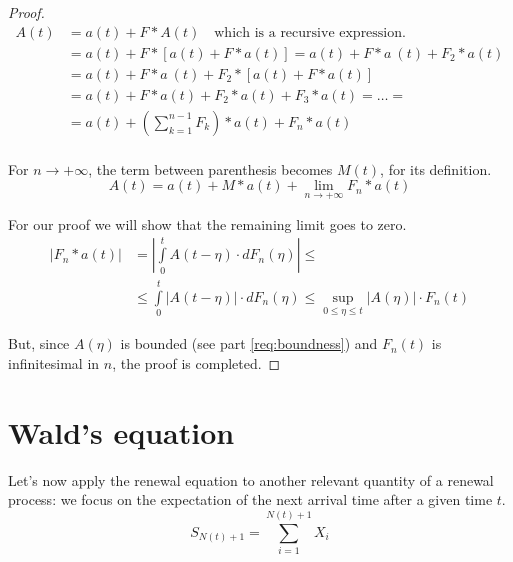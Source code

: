 \begin{proof}
	\begin{equation}\begin{split}
		A(t) &= a(t) + F \ast A(t) \quad \text{which is a recursive expression.} \\
		&= a(t) + F \ast \left[a(t) + F \ast a(t) \right] = a(t) + F \ast a ~ (t) + F_2 \ast a(t) \\
		&= a(t) + F \ast a ~ (t) + F_2 \ast \left[a(t) + F \ast a(t) \right] \\
		&= a(t) + F \ast a(t) + F_2 \ast a(t) + F_3 \ast a(t) = \dots  = \\
		&= a(t) + \left( \sum\limits_{k=1}^{n-1}F_k\right) \ast a(t) + F_n \ast a(t) \\
	\end{split} \end{equation}

	For $n \to +\infty$, the term between parenthesis becomes $M(t)$, for its definition.
	\begin{equation}
		A(t) = a(t) + M \ast a(t) + \lim_{n \to +\infty} F_n \ast a(t)
	\end{equation}

	For our proof we will show that the remaining limit goes to zero.
	\begin{equation} \begin{split}
		|F_n \ast a(t)| & = \left| \int\limits_0^{t}A(t-\eta) \cdot dF_n(\eta) \right| \le \\
		& \le \int\limits_0^{t}|A(t-\eta)| \cdot dF_n(\eta) \le \sup\limits_{0 \le \eta \le t} |A(\eta)| \cdot F_n (t)
	\end{split}\end{equation}

	But, since $A(\eta)$ is bounded (see part \ref{req:boundness}) and $F_n(t)$ is infinitesimal in $n$, the proof is completed.
\end{proof}

\section{Wald's equation}

Let's now apply the renewal equation to another relevant quantity of a renewal process: we focus on the expectation of the next arrival time after a given time $t$.
	$$ S_{N(t) + 1} = \sum\limits_{i=1}^{N(t)+1}X_i $$


